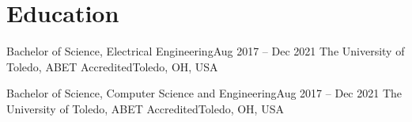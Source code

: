\section{Education}
\mySubHeadingListStart

  \mySubHeading
    {Bachelor of Science, Electrical Engineering}{Aug 2017 -- Dec 2021}
    {The University of Toledo, ABET Accredited}{Toledo, OH, USA}
    \myItemListStart
    \myItemListEnd

  \mySubHeading
    {Bachelor of Science, Computer Science and Engineering}{Aug 2017 -- Dec 2021}
    {The University of Toledo, ABET Accredited}{Toledo, OH, USA}
    \myItemListStart
    \myItemListEnd

\mySubHeadingListEnd
